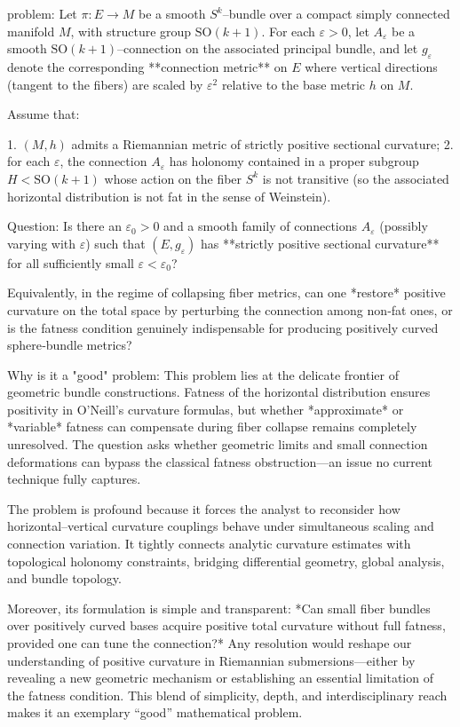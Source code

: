 problem:  
Let $\pi: E \to M$ be a smooth $S^k$–bundle over a compact simply connected manifold $M$, with structure group $\mathrm{SO}(k+1)$.  
For each $\varepsilon>0$, let $A_\varepsilon$ be a smooth $\mathrm{SO}(k+1)$–connection on the associated principal bundle, and let $g_\varepsilon$ denote the corresponding **connection metric** on $E$ where vertical directions (tangent to the fibers) are scaled by $\varepsilon^2$ relative to the base metric $h$ on $M$.  

Assume that:  

1. $(M,h)$ admits a Riemannian metric of strictly positive sectional curvature;  
2. for each $\varepsilon$, the connection $A_\varepsilon$ has holonomy contained in a proper subgroup $H < \mathrm{SO}(k+1)$ whose action on the fiber $S^k$ is not transitive (so the associated horizontal distribution is not fat in the sense of Weinstein).  

Question:  
Is there an $\varepsilon_0>0$ and a smooth family of connections $A_\varepsilon$ (possibly varying with $\varepsilon$) such that $(E,g_\varepsilon)$ has **strictly positive sectional curvature** for all sufficiently small $\varepsilon<\varepsilon_0$?  

Equivalently, in the regime of collapsing fiber metrics, can one *restore* positive curvature on the total space by perturbing the connection among non‑fat ones, or is the fatness condition genuinely indispensable for producing positively curved sphere‑bundle metrics?  

Why is it a "good" problem:  
This problem lies at the delicate frontier of geometric bundle constructions. Fatness of the horizontal distribution ensures positivity in O’Neill’s curvature formulas, but whether *approximate* or *variable* fatness can compensate during fiber collapse remains completely unresolved. The question asks whether geometric limits and small connection deformations can bypass the classical fatness obstruction—an issue no current technique fully captures.  

The problem is profound because it forces the analyst to reconsider how horizontal–vertical curvature couplings behave under simultaneous scaling and connection variation. It tightly connects analytic curvature estimates with topological holonomy constraints, bridging differential geometry, global analysis, and bundle topology.  

Moreover, its formulation is simple and transparent: *Can small fiber bundles over positively curved bases acquire positive total curvature without full fatness, provided one can tune the connection?* Any resolution would reshape our understanding of positive curvature in Riemannian submersions—either by revealing a new geometric mechanism or establishing an essential limitation of the fatness condition. This blend of simplicity, depth, and interdisciplinary reach makes it an exemplary “good” mathematical problem.